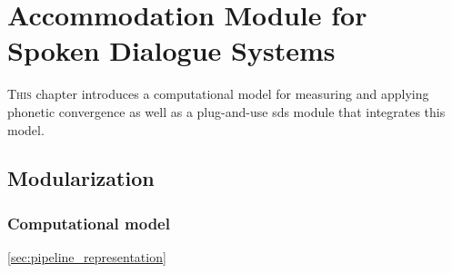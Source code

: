 \chapter[Accommodation Module for Spoken Dialogue Systems]{Accommodation Module for\\Spoken Dialogue Systems}
\label{chap:convergence_module_for_sdss}

\lettrine{T}{his} chapter introduces a computational model for measuring and applying phonetic convergence as well as a plug-and-use \acs{sds} module that integrates this model.

\pagebreak

\section{Modularization}
\label{sec:modularization}


\subsection{Computational model}
\label{subsec:computational_model}

 \cref{sec:pipeline_representation}


